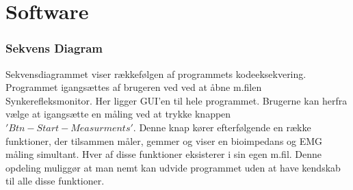 %
%
%
%
%
	
	
	
\chapter{Software}
\subsection{Sekvens Diagram}

Sekvensdiagrammet viser rækkefølgen af programmets kodeeksekvering. Programmet igangsættes af brugeren ved ved at åbne m.filen Synkerefleksmonitor. Her ligger GUI'en til hele programmet. Brugerne kan herfra vælge at igangsætte en måling ved at trykke knappen $'Btn-Start-Measurments'$. Denne knap kører efterfølgende en række funktioner, der tilsammen måler, gemmer og viser en bioimpedans og EMG måling simultant. Hver af disse funktioner eksisterer i sin egen m.fil. Denne opdeling muliggør at man nemt kan udvide programmet uden at have kendskab til alle disse funktioner.    

